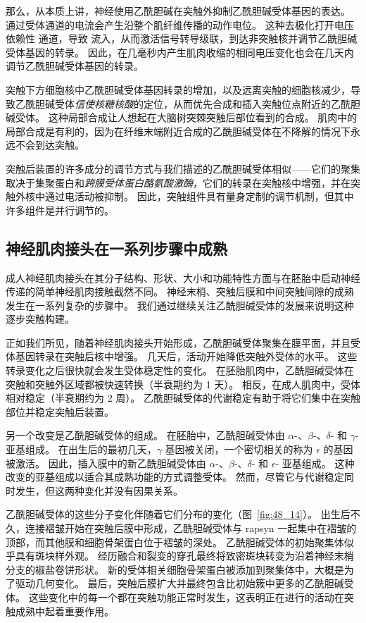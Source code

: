 那么，从本质上讲，神经使用乙酰胆碱在突触外抑制乙酰胆碱受体基因的表达。
通过受体通道的电流会产生沿整个肌纤维传播的动作电位。
这种去极化打开电压依赖性 通道，导致 流入，从而激活信号转导级联，到达非突触核并调节乙酰胆碱受体基因的转录。
因此，在几毫秒内产生肌肉收缩的相同电压变化也会在几天内调节乙酰胆碱受体基因的转录。


突触下方细胞核中乙酰胆碱受体基因转录的增加，以及远离突触的细胞核减少，导致乙酰胆碱受体\textit{信使核糖核酸}的定位，从而优先合成和插入突触位点附近的乙酰胆碱受体。
这种局部合成让人想起在大脑树突棘突触后部位看到的合成。
肌肉中的局部合成是有利的，因为在纤维末端附近合成的乙酰胆碱受体在不降解的情况下永远不会到达突触。


突触后装置的许多成分的调节方式与我们描述的乙酰胆碱受体相似——它们的聚集取决于集聚蛋白和\textit{跨膜受体蛋白酪氨酸激酶}，它们的转录在突触核中增强，并在突触外核中通过电活动被抑制。
因此，突触组件具有量身定制的调节机制，但其中许多组件是并行调节的。



\subsection{神经肌肉接头在一系列步骤中成熟}

成人神经肌肉接头在其分子结构、形状、大小和功能特性方面与在胚胎中启动神经传递的简单神经肌肉接触截然不同。
神经末梢、突触后膜和中间突触间隙的成熟发生在一系列复杂的步骤中。
我们通过继续关注乙酰胆碱受体的发展来说明这种逐步突触构建。


正如我们所见，随着神经肌肉接头开始形成，乙酰胆碱受体聚集在膜平面，并且受体基因转录在突触后核中增强。
几天后，活动开始降低突触外受体的水平。
这些转录变化之后很快就会发生受体稳定性的变化。
在胚胎肌肉中，乙酰胆碱受体在突触和突触外区域都被快速转换（半衰期约为 1 天）。
相反，在成人肌肉中，受体相对稳定（半衰期约为 2 周）。
乙酰胆碱受体的代谢稳定有助于将它们集中在突触部位并稳定突触后装置。


另一个改变是乙酰胆碱受体的组成。
在胚胎中，乙酰胆碱受体由 $ \alpha $-、$ \beta $-、$ \delta $- 和 $ \gamma $- 亚基组成。
在出生后的最初几天，$ \gamma $ 基因被关闭，一个密切相关的称为 $ \epsilon $ 的基因被激活。
因此，插入膜中的新乙酰胆碱受体由 $ \alpha $-、$ \beta $-、$ \delta $- 和 $ \epsilon $- 亚基组成。
这种改变的亚基组成以适合其成熟功能的方式调整受体。
然而，尽管它与代谢稳定同时发生，但这两种变化并没有因果关系。


乙酰胆碱受体的这些分子变化伴随着它们分布的变化（图~\ref{fig:48_14}）。
出生后不久，连接褶皱开始在突触后膜中形成，乙酰胆碱受体与 rapsyn 一起集中在褶皱的顶部，而其他膜和细胞骨架蛋白位于褶皱的深处。
乙酰胆碱受体的初始聚集体似乎具有斑块样外观。
经历融合和裂变的穿孔最终将致密斑块转变为沿着神经末梢分支的椒盐卷饼形状。
新的受体相关细胞骨架蛋白被添加到聚集体中，大概是为了驱动几何变化。
最后，突触后膜扩大并最终包含比初始簇中更多的乙酰胆碱受体。
这些变化中的每一个都在突触功能正常时发生，这表明正在进行的活动在突触成熟中起着重要作用。



